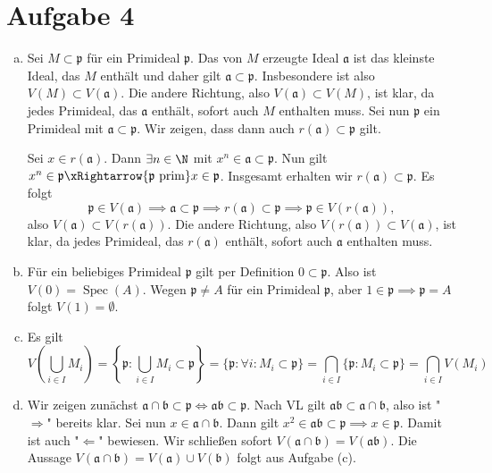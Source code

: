\documentclass{article}
\begin{document}
\section*{Aufgabe 4}
\begin{enumerate}[(a)]
    \item Sei $M \subset \mathfrak{p}$ für ein Primideal $\mathfrak{p}$. 
    Das von $M$ erzeugte Ideal $\mathfrak{a}$ ist das kleinste Ideal, das $M$ enthält und daher gilt $\mathfrak{a} \subset \mathfrak{p}$.
    Insbesondere ist also $V(M) \subset V(\mathfrak{a})$. 
    Die andere Richtung, also $V(\mathfrak{a}) \subset V(M)$, ist klar, da jedes Primideal, das $\mathfrak{a}$ enthält, sofort auch $M$ enthalten muss.
    Sei nun $\mathfrak{p}$ ein Primideal mit $\mathfrak{a}\subset \mathfrak{p}$.
    Wir zeigen, dass dann auch $r(\mathfrak{a}) \subset \mathfrak{p}$ gilt.

    Sei $x \in r(\mathfrak{a})$. Dann $\exists n \in\N$ mit $x^n \in \mathfrak{a} \subset \mathfrak{p}$.
    Nun gilt $x^n \in \mathfrak{p} \xRightarrow{\mathfrak{p} \text{ prim}} x \in \mathfrak{p}$.
    Insgesamt erhalten wir $r(\mathfrak{a}) \subset \mathfrak{p}$. 
    Es folgt
    \[
        \mathfrak{p} \in V(\mathfrak{a}) \implies \mathfrak{a} \subset \mathfrak{p} \implies r(\mathfrak{a}) \subset \mathfrak{p} \implies \mathfrak{p} \in V(r(\mathfrak{a})),
    \]
    also $V(\mathfrak{a}) \subset V(r(\mathfrak{a}))$.
    Die andere Richtung, also $V(r(\mathfrak{a})) \subset V(\mathfrak{a})$, ist klar, da jedes Primideal, das $r(\mathfrak{a})$ enthält, sofort auch $\mathfrak{a}$ enthalten muss.
    \item Für ein beliebiges Primideal $\mathfrak{p}$ gilt per Definition $0 \subset \mathfrak{p}$.
    Also ist $V(0) = \operatorname{Spec}(A)$. Wegen $\mathfrak{p} \neq A$ für ein Primideal $\mathfrak{p}$, aber $1 \in \mathfrak{p} \implies \mathfrak{p} = A$ folgt $V(1) = \emptyset$.
    \item Es gilt
    \[
        V\left( \bigcup_{i \in I} M_i\right) = \left\{\mathfrak{p} \colon \bigcup_{i\in I} M_i \subset \mathfrak{p}\right\} = \{\mathfrak{p} \colon \forall i \colon M_i \subset \mathfrak{p}\} = \bigcap_{i\in I} \{\mathfrak{p} \colon  M_i\subset \mathfrak{p}\} = \bigcap_{i\in I} V(M_i)
    \]
    \item Wir zeigen zunächst $\mathfrak{a}\cap \mathfrak{b} \subset \mathfrak{p} \Leftrightarrow \mathfrak{ab} \subset \mathfrak{p}$.
    Nach VL gilt $\mathfrak{ab} \subset \mathfrak{a}\cap \mathfrak{b}$, also ist "$\Rightarrow$" bereits klar.
    Sei nun $x \in \mathfrak{a}\cap \mathfrak{b}$. Dann gilt $x^2 \in \mathfrak{a}\mathfrak{b} \subset \mathfrak{p} \implies x \in \mathfrak{p}$.
    Damit ist auch "$\Leftarrow$" bewiesen.
    Wir schließen sofort $V(\mathfrak{a} \cap\mathfrak{b}) = V(\mathfrak{a}\mathfrak{b})$.
    Die Aussage $V(\mathfrak{a} \cap\mathfrak{b}) = V(\mathfrak{a}) \cup V(\mathfrak{b})$ folgt aus Aufgabe (c).
\end{enumerate}
\end{document}
